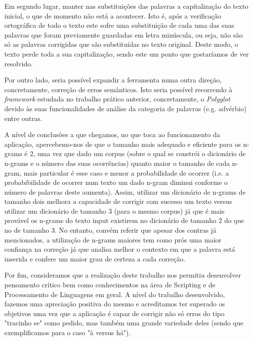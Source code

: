\documentclass{article}
\begin{document}
Em segundo lugar, manter nas substituições das palavras a capitalização do texto inicial, o que de momento não está a acontecer. Isto é, após a verificação ortográfica de todo o texto este sofre uma substituição de cada uma das suas palavras que foram previamente guardadas em letra minúscula, ou seja, não são só as palavras corrigidas que são substituídas no texto original. Deste modo, o texto perde toda a sua capitalização, sendo este um ponto que gostaríamos de ver resolvido.

Por outro lado, seria possível expandir a ferramenta numa outra direção, concretamente, correção de erros semânticos. Isto seria possível recorrendo à \textit{framework} estudada no trabalho prático anterior, concretamente, o \textit{Polyglot} devido às suas funcionalidades de análise da categoria de palavras (e.g. advérbio) entre outras.

A nível de conclusões a que chegamos, no que toca ao funcionamento da aplicação, apercebemo-nos de que o tamanho mais adequado e eficiente para os n-grams é 2, uma vez que dado um corpus (sobre o qual se constrói o dicionário de n-grams e o número das suas ocorrências) quanto maior o tamanho de cada n-gram, mais particular é esse caso e menor a probabilidade de ocorrer (i.e. a probabibilidade de ocorrer num texto um dado n-gram diminui conforme o número de palavras deste aumenta). Assim, utilizar um dicionário de n-grams de tamanho dois melhora a capacidade de corrigir com sucesso um texto versus utilizar um dicionário de tamanho 3 (para o mesmo corpus) já que é mais provável os n-grams do texto input existirem no dicionário de tamanho 2 do que no de tamanho 3. No entanto, convém referir que apesar dos contras já mencionados, a utilização de n-grams maiores tem como prós uma maior confiança na correção já que analisa melhor o contexto em que a palavra está inserida e confere um maior grau de certeza a cada correção.

Por fim, consideramos que a realização deste trabalho nos permitiu desenvolver pensamento crítico bem como conhecimentos na área de Scripting e de Processamento de Linguagens em geral. A nível do trabalho desenvolvido, fazemos uma apreciação positiva do mesmo e acreditamos ter superado os objetivos uma vez que a aplicação é capaz de corrigir não só erros do tipo "tracinho se" como pedido, mas também uma grande variedade deles (sendo que exemplificamos para o caso "à versus há").


\printbibliography

\newpage 
\begin{appendices}

\end{appendices}
\end{document}
